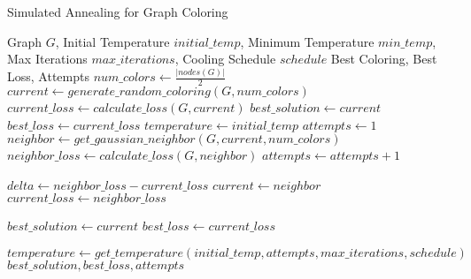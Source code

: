 \documentclass{article}
\begin{document}
\begin{algorithm}
\caption{Simulated Annealing for Graph Coloring}
\begin{algorithmic}[1]
\REQUIRE Graph $G$, Initial Temperature $initial\_temp$, Minimum Temperature $min\_temp$, Max Iterations $max\_iterations$, Cooling Schedule $schedule$
\ENSURE Best Coloring, Best Loss, Attempts
\STATE $num\_colors \gets \frac{|nodes(G)|}{2}$
\STATE $current \gets generate\_random\_coloring(G, num\_colors)$
\STATE $current\_loss \gets calculate\_loss(G, current)$
\STATE $best\_solution \gets current$
\STATE $best\_loss \gets current\_loss$
\STATE $temperature \gets initial\_temp$
\STATE $attempts \gets 1$
    \STATE $neighbor \gets get\_gaussian\_neighbor(G, current, num\_colors)$
    \STATE $neighbor\_loss \gets calculate\_loss(G, neighbor)$
    \STATE $attempts \gets attempts + 1$
    
    \STATE $delta \gets neighbor\_loss - current\_loss$
        \STATE $current \gets neighbor$
        \STATE $current\_loss \gets neighbor\_loss$
        
            \STATE $best\_solution \gets current$
            \STATE $best\_loss \gets current\_loss$
        \ENDIF
    \ENDIF
    
    \STATE $temperature \gets get\_temperature(initial\_temp, attempts, max\_iterations, schedule)$
\ENDWHILE
\RETURN $best\_solution, best\_loss, attempts$
\end{algorithmic}
\end{algorithm}
\end{document}
